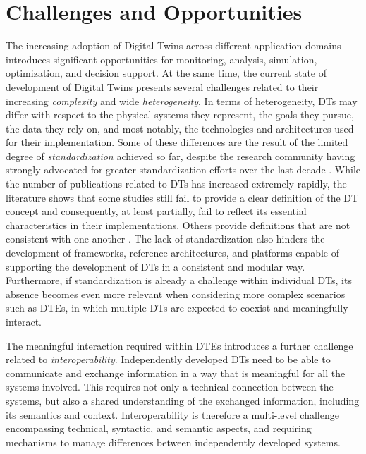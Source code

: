 \section{Challenges and Opportunities}

\label{sec:challenges}

The increasing adoption of Digital Twins across different application domains introduces significant opportunities for monitoring, analysis, simulation, optimization, and decision support. At the same time, the current state of development of Digital Twins presents several challenges related to their increasing \textit{complexity} and wide \textit{heterogeneity}. In terms of heterogeneity, DTs may differ with respect to the physical systems they represent, the goals they pursue, the data they rely on, and most notably, the technologies and architectures used for their implementation.
%
Some of these differences are the result of the limited degree of \textit{standardization} achieved so far, despite the research community having strongly advocated for greater standardization efforts over the last decade \cite{wang2022standards,wuni2026}.
%
While the number of publications related to DTs has increased extremely rapidly, the literature shows that some studies still fail to provide a clear definition of the DT concept and consequently, at least partially, fail to reflect its essential characteristics in their implementations. Others provide definitions that are not consistent with one another \cite{wuni2026,tao2022}.
%
The lack of standardization also hinders the development of frameworks, reference architectures, and platforms capable of supporting the development of DTs in a consistent and modular way.
%
Furthermore, if standardization is already a challenge within individual DTs, its absence becomes even more relevant when considering more complex scenarios such as DTEs, in which multiple DTs are expected to coexist and meaningfully interact.

The meaningful interaction required within DTEs introduces a further challenge related to \textit{interoperability}. Independently developed DTs need to be able to communicate and exchange information in a way that is meaningful for all the systems involved. This requires not only a technical connection between the systems, but also a shared understanding of the exchanged information, including its semantics and context. Interoperability is therefore a multi-level challenge encompassing technical, syntactic, and semantic aspects, and requiring mechanisms to manage differences between independently developed systems.

